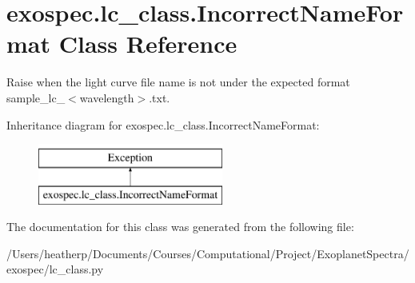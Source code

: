 \hypertarget{classexospec_1_1lc__class_1_1_incorrect_name_format}{}\section{exospec.\+lc\+\_\+class.\+Incorrect\+Name\+Format Class Reference}
\label{classexospec_1_1lc__class_1_1_incorrect_name_format}


Raise when the light curve file name is not under the expected format sample\+\_\+lc\+\_\+$<$wavelength$>$.\+txt.  


Inheritance diagram for exospec.\+lc\+\_\+class.\+Incorrect\+Name\+Format\+:\begin{figure}[H]
\begin{center}
\leavevmode
\includegraphics[height=2.000000cm]{classexospec_1_1lc__class_1_1_incorrect_name_format}
\end{center}
\end{figure}


The documentation for this class was generated from the following file\+:\begin{DoxyCompactItemize}
\item 
/\+Users/heatherp/\+Documents/\+Courses/\+Computational/\+Project/\+Exoplanet\+Spectra/exospec/lc\+\_\+class.\+py\end{DoxyCompactItemize}
